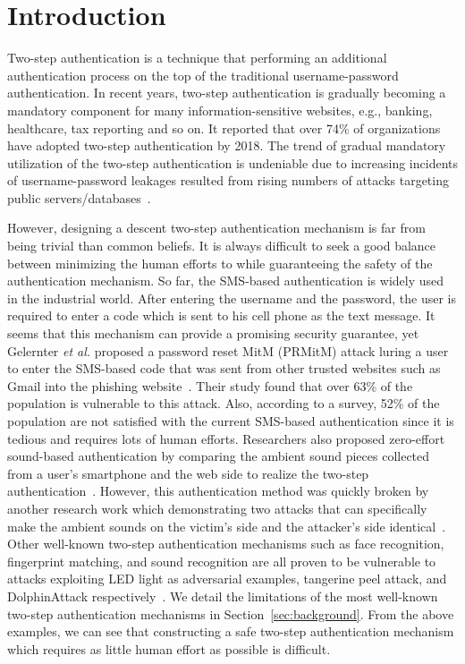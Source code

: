 \section{Introduction}
\label{sec:introduction}
Two-step authentication is a technique that performing an additional authentication process on the top of the traditional username-password authentication. In recent years, two-step authentication is gradually becoming a mandatory component for many information-sensitive websites, e.g., banking, healthcare, tax reporting and so on. It reported that over 74\% of organizations have adopted two-step authentication by 2018. The trend of gradual mandatory utilization of the two-step authentication is undeniable due to increasing incidents of username-password leakages resulted from rising numbers of attacks targeting public servers/databases~\cite{passwordleak}. 

However, designing a descent two-step authentication mechanism is far from being trivial than common beliefs. It is always difficult to seek a good balance between minimizing the human efforts to while guaranteeing the safety of the authentication mechanism. So far, the SMS-based authentication is widely used in the industrial world. After entering the username and the password, the user is required to enter a code which is sent to his cell phone as the text message. It seems that this mechanism can provide a promising security guarantee, yet Gelernter \emph{et al.} proposed a password reset MitM (PRMitM) attack luring a user to enter the SMS-based code that was sent from other trusted websites such as Gmail into the phishing website~\cite{gelernter2017password}. Their study found that over 63\% of the population is vulnerable to this attack. Also, according to a survey, 52\% of the population are not satisfied with the current SMS-based authentication since it is tedious and requires lots of human efforts. Researchers also proposed zero-effort sound-based authentication by comparing the ambient sound pieces collected from a user's smartphone and the web side to realize the two-step authentication~\cite{karapanos2015soundproof}. However, this authentication method was quickly broken by another research work which demonstrating two attacks that can specifically make the ambient sounds on the victim's side and the attacker's side identical~\cite{shrestha2016sounds}. Other well-known two-step authentication mechanisms such as face recognition, fingerprint matching, and sound recognition are all proven to be vulnerable to attacks exploiting LED light as adversarial examples, tangerine peel attack, and DolphinAttack respectively~\cite{zhou2018invisible}\cite{tangerinpeel}\cite{zhang2017dolphinattack}. We detail the limitations of the most well-known two-step authentication mechanisms in Section~\ref{sec:background}. From the above examples, we can see that constructing a safe two-step authentication mechanism which requires as little human effort as possible is difficult.

